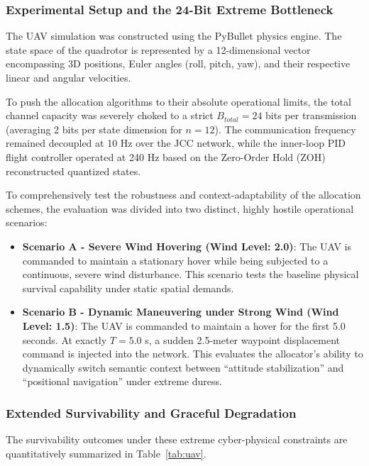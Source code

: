 \subsubsection{Experimental Setup and the 24-Bit Extreme Bottleneck}
The UAV simulation was constructed using the PyBullet physics engine. The state space of the quadrotor is represented by a 12-dimensional 
vector encompassing 3D positions, Euler angles (roll, pitch, yaw), and their respective linear and angular velocities.

To push the allocation algorithms to their absolute operational limits, the total channel capacity was severely choked to a strict $B_{total}=24$ 
bits per transmission (averaging 2 bits per state dimension for $n=12$). The communication frequency remained decoupled at 10 Hz over the JCC network, while the inner-loop 
PID flight controller operated at 240 Hz based on the Zero-Order Hold (ZOH) reconstructed quantized states.

To comprehensively test the robustness and context-adaptability of the allocation schemes, the evaluation was divided into two distinct,
highly hostile operational scenarios:
\begin{itemize}
    \item \textbf{Scenario A - Severe Wind Hovering (Wind Level: 2.0)}: The UAV is commanded to maintain a stationary hover while being subjected to a continuous, severe wind disturbance. This scenario tests the baseline physical survival capability under static spatial demands.
    \item \textbf{Scenario B - Dynamic Maneuvering under Strong Wind (Wind Level: 1.5)}: The UAV is commanded to maintain a hover for the first 5.0 seconds. At exactly $T = 5.0$ s, a sudden 2.5-meter waypoint displacement command is injected into the network. This evaluates the allocator's ability to dynamically switch semantic context between ``attitude stabilization'' and ``positional navigation'' under extreme duress.
\end{itemize}
\subsubsection{Extended Survivability and Graceful Degradation}
The survivability outcomes under these extreme cyber-physical constraints are quantitatively summarized in Table~\ref{tab:uav}.

